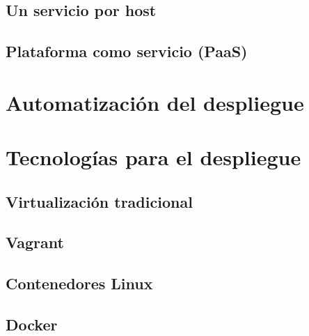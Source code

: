 \documentclass[11pt,a4paper]{article}
\begin{document}
\subsection{Un servicio por host}

\subsection{Plataforma como servicio (PaaS)}

\section{Automatización del despliegue}

\section{Tecnologías para el despliegue}

\subsection{Virtualización tradicional}

\subsection{Vagrant}

\subsection{Contenedores Linux}

\subsection{Docker}
\end{document}
